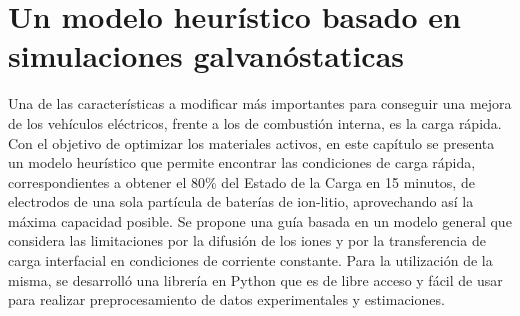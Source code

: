 \chapter{Un modelo heurístico basado en simulaciones galvanóstaticas}\label{ch:un}
\thispagestyle{empty}

\vspace{50pt}

\begin{adjustwidth}{50pt}{50pt}
    Una de las características a modificar más importantes para conseguir una mejora de los 
    vehículos eléctricos, frente a los de combustión interna, es la carga rápida.
    Con el objetivo de optimizar los materiales activos, en este
    capítulo se presenta un modelo heurístico que permite encontrar las 
    condiciones de carga rápida, correspondientes a obtener el 80\% del Estado de la Carga en 15 minutos, de
    electrodos de una sola partícula de baterías de ion-litio, aprovechando así
    la máxima capacidad posible. Se propone una guía basada en un modelo general 
    que considera las limitaciones por la difusión de los iones y por la transferencia de carga interfacial
    en condiciones de corriente constante. Para la utilización de la misma, se 
    desarrolló una librería en Python que es de libre acceso y fácil de usar para 
    realizar preprocesamiento de datos experimentales y estimaciones.
\end{adjustwidth}

\clearpage
\newpage
\thispagestyle{empty}
\mbox{}
\newpage





